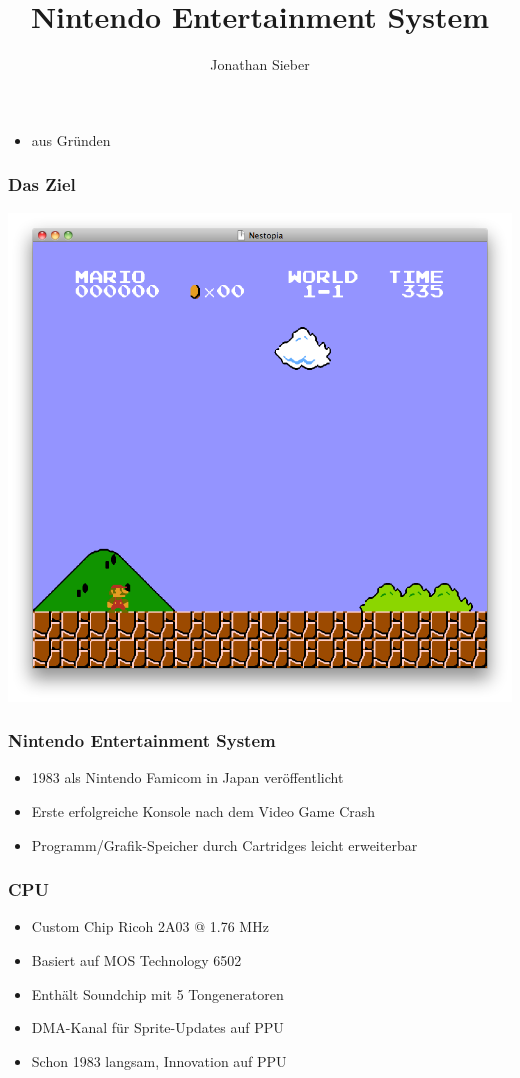 \documentclass{beamer}
\title{Nintendo Entertainment System}
\author{Jonathan Sieber}
\begin{document}
    \maketitle
    \begin{frame}
    \frametitle{}
    \begin{itemize}
        \item{aus Gründen}
    \end{itemize}
    \end{frame}
    
    
    \begin{frame}
        \frametitle{Das Ziel}
        \includegraphics[width=0.8\linewidth]{img/smb.png}
    \end{frame}
    
    \begin{frame}
        \frametitle{Nintendo Entertainment System}
        \begin{itemize}
            \item{1983 als Nintendo Famicom in Japan veröffentlicht}
            \item{Erste erfolgreiche Konsole nach dem Video Game Crash}
            \item{Programm/Grafik-Speicher durch Cartridges leicht erweiterbar}
        \end{itemize}
    \end{frame}
    
    \begin{frame}
        \frametitle{CPU}
        \begin{itemize}
            \item{Custom Chip Ricoh 2A03 @ 1.76 MHz}
            \item{Basiert auf MOS Technology 6502}
            \item{Enthält Soundchip mit 5 Tongeneratoren}
            \item{DMA-Kanal für Sprite-Updates auf PPU}
            \item{Schon 1983 langsam, Innovation auf PPU}
        \end{itemize}
    \end{frame}
    
\end{document}
